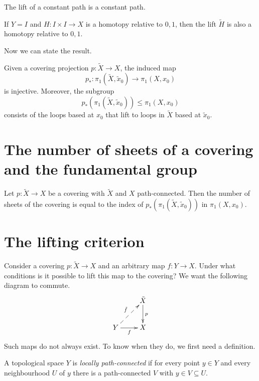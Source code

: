 \begin{remark}
\label{remark-lift-constant-path}
The lift of a constant path is a constant
path.
\end{remark}

\begin{remark}
\label{remark-lift-homotopy-rel-endpoints}
If $Y=I$ and $H:I\times I\to X$ is a
homotopy relative to $0,1$, then the lift
$\tilde{H}$ is also a homotopy relative to
$0,1$.
\end{remark}

Now we can state the result.

\begin{proposition}
\label{proposition-covering-injective-pi1}
Given a covering projection
$p:\tilde{X}\to X$, the induced map
$$
p_*:\pi_1(\tilde{X},\tilde{x}_0)
\to\pi_1(X,x_0)
$$
is injective. Moreover, the subgroup
$$
p_*\left(\pi_1(\tilde{X},\tilde{x}_0)
\right)\leq\pi_1(X,x_0)
$$
consists of the loops based at $x_0$ that
lift to loops in $\tilde{X}$ based at
$\tilde{x}_0$.
\end{proposition}

\section{The number of sheets of a covering
and the fundamental group}
\label{section-covering-number-sheets}

\begin{proposition}
\label{proposition-covering-sheets-index}
Let $p:\tilde{X}\to X$ be a covering with
$\tilde{X}$ and $X$ path-connected. Then the
number of sheets of the covering is equal to
the index of
$p_*(\pi_1(\tilde{X},\tilde{x}_0))$ in
$\pi_1(X,x_0)$.
\end{proposition}

\section{The lifting criterion}
\label{section-covering-lifting-criterion}

Consider a covering $p:\tilde{X}\to X$ and
an arbitrary map $f:Y\to X$. Under what
conditions is it possible to lift this map
to the covering? We want the following
diagram to commute.
$$
\xymatrix{
  & \tilde{X} \ar[d]^{p} \\
Y \ar@{-->}[ur]^{\tilde{f}}
  \ar[r]_{f}
  & X
}
$$
Such maps do not always exist. To know when
they do, we first need a definition.

\begin{definition}
\label{definition-locally-path-connected}
A topological space $Y$ is
{\it locally path-connected} if for every
point $y\in Y$ and every neighbourhood $U$
of $y$ there is a path-connected $V$ with
$y\in V\subseteq U$.
\end{definition}

